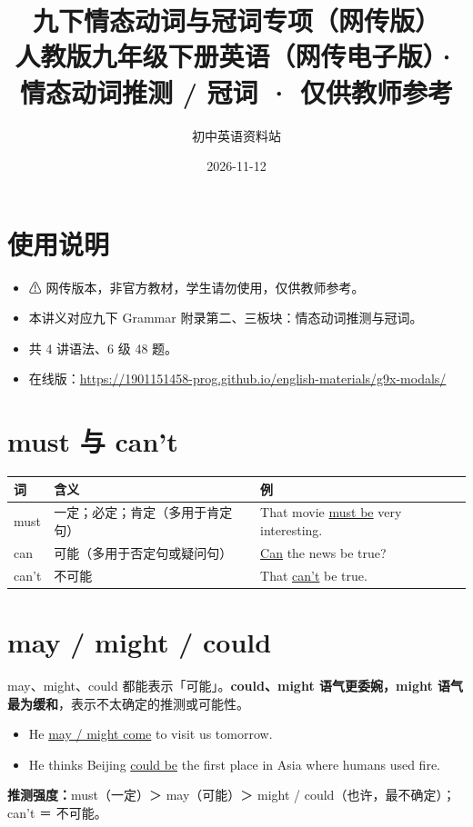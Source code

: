 \documentclass[11pt,a4paper]{ctexart}
\title{\textbf{九下情态动词与冠词专项（网传版）}\\[4pt]
\large 人教版九年级下册英语（网传电子版）· 情态动词推测 / 冠词 · 仅供教师参考}
\author{初中英语资料站}
\date{2026-11-12}
\begin{document}
\maketitle

\section*{使用说明}
\begin{itemize}[leftmargin=1.4em]
\item ⚠ 网传版本，非官方教材，学生请勿使用，仅供教师参考。
\item 本讲义对应九下 Grammar 附录第二、三板块：情态动词推测与冠词。
\item 共 4 讲语法、6 级 48 题。
\item 在线版：\url{https://1901151458-prog.github.io/english-materials/g9x-modals/}
\end{itemize}

\begin{center}
\end{center}
\bigskip
\section{must 与 can't}
\begin{center}
\begin{tabular}{p{2.4cm}p{5.4cm}p{4.4cm}}
\hline
\textbf{词} & \textbf{含义} & \textbf{例}\\
\hline
must & 一定；必定；肯定（多用于肯定句） & That movie \underline{must be} very interesting.\\
can & 可能（多用于否定句或疑问句） & \underline{Can} the news be true?\\
can't & 不可能 & That \underline{can't} be true.\\
\hline
\end{tabular}
\end{center}

\section{may / might / could}
may、might、could 都能表示「可能」。\textbf{could、might 语气更委婉，might 语气最为缓和}，表示不太确定的推测或可能性。
\begin{itemize}[leftmargin=1.4em]
\item He \underline{may / might come} to visit us tomorrow.
\item He thinks Beijing \underline{could be} the first place in Asia where humans used fire.
\end{itemize}
\textbf{推测强度：}must（一定）＞ may（可能）＞ might / could（也许，最不确定）；can't ＝ 不可能。
\end{document}
